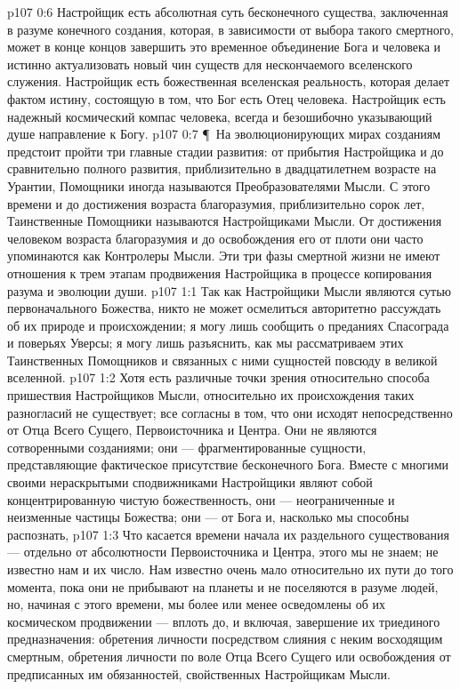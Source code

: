 \vs p107 0:6 Настройщик есть абсолютная суть бесконечного существа, заключенная в разуме конечного создания, которая, в зависимости от выбора такого смертного, может в конце концов завершить это временное объединение Бога и человека и истинно актуализовать новый чин существ для нескончаемого вселенского служения. Настройщик есть божественная вселенская реальность, которая делает фактом истину, состоящую в том, что Бог есть Отец человека. Настройщик есть надежный космический компас человека, всегда и безошибочно указывающий душе направление к Богу.
\vs p107 0:7 \P\ На эволюционирующих мирах созданиям предстоит пройти три главные стадии развития: от прибытия Настройщика и до сравнительно полного развития, приблизительно в двадцатилетнем возрасте на Урантии, Помощники иногда называются Преобразователями Мысли. С этого времени и до достижения возраста благоразумия, приблизительно сорок лет, Таинственные Помощники называются Настройщиками Мысли. От достижения человеком возраста благоразумия и до освобождения его от плоти они часто упоминаются как Контролеры Мысли. Эти три фазы смертной жизни не имеют отношения к трем этапам продвижения Настройщика в процессе копирования разума и эволюции души.
\vs p107 1:1 Так как Настройщики Мысли являются сутью первоначального Божества, никто не может осмелиться авторитетно рассуждать об их природе и происхождении; я могу лишь сообщить о преданиях Спасограда и поверьях Уверсы; я могу лишь разъяснить, как мы рассматриваем этих Таинственных Помощников и связанных с ними сущностей повсюду в великой вселенной.
\vs p107 1:2 Хотя есть различные точки зрения относительно способа пришествия Настройщиков Мысли, относительно их происхождения таких разногласий не существует; все согласны в том, что они исходят непосредственно от Отца Всего Сущего, Первоисточника и Центра. Они не являются сотворенными созданиями; они --- фрагментированные сущности, представляющие фактическое присутствие бесконечного Бога. Вместе с многими своими нераскрытыми сподвижниками Настройщики являют собой концентрированную чистую божественность, они --- неограниченные и неизменные частицы Божества; они --- от Бога и, насколько мы способны распознать, 
\vs p107 1:3 Что касается времени начала их раздельного существования --- отдельно от абсолютности Первоисточника и Центра, этого мы не знаем; не известно нам и их число. Нам известно очень мало относительно их пути до того момента, пока они не прибывают на планеты и не поселяются в разуме людей, но, начиная с этого времени, мы более или менее осведомлены об их космическом продвижении --- вплоть до, и включая, завершение их триединого предназначения: обретения личности посредством слияния с неким восходящим смертным, обретения личности по воле Отца Всего Сущего или освобождения от предписанных им обязанностей, свойственных Настройщикам Мысли.
